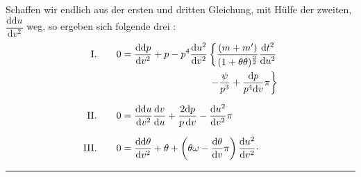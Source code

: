 \par\noindent Schaffen wir endlich aus der ersten und dritten Gleichung, mit Hülfe der
zweiten, \(\dfrac{\mathrm{dd}u}{\mathrm{d}v^2}\) weg, so ergeben sich folgende drei
:
\[
\begin{aligned}
\mathrm{I.}\qquad0&=\frac{\mathrm{dd}p}{\mathrm{d}v^2}+p
 -p^4\frac{\mathrm{d}u^2}{\mathrm{d}v^2}
 \left\{\frac{(m+m')}{(1+\theta\theta)^{\frac{3}{2}}}
 \frac{\mathrm{d}t^2}{\mathrm{d}u^2}\right.\\
 &\hspace{9em}\left.-\frac{\psi}{p^3}
 +\frac{\mathrm{d}p}{p^4\mathrm{d}v}\pi\right\}\\[6pt]
\mathrm{II.}\qquad0&=\frac{\mathrm{dd}u}{\mathrm{d}v^2}\frac{\mathrm{d}v}{\mathrm{d}u}
 +\frac{2\mathrm{d}p}{p\,\mathrm{d}v}
 -\frac{\mathrm{d}u^2}{\mathrm{d}v^2}\pi\\[6pt]
\mathrm{III.}\qquad0&=\frac{\mathrm{dd}\theta}{\mathrm{d}v^2}+\theta
 +\left(\theta\omega-\frac{\mathrm{d}\theta}{\mathrm{d}v}\pi\right)
 \frac{\mathrm{d}u^2}{\mathrm{d}v^2}\mathpunct{\raisebox{.4ex}{.}}
\end{aligned}
\]
\begin{center}\rule{.9in}{.35pt}\end{center}
\clearpage
\endgroup
